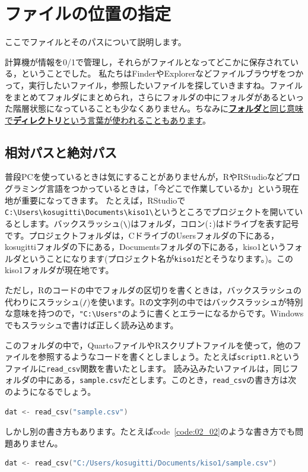 \documentclass{ltjsbook}
\begin{document}
\section{ファイルの位置の指定}
\label{setLocation}
ここでファイルとそのパスについて説明します。

計算機が情報を0/1で管理し，それらがファイルとなってどこかに保存されている，ということでした。
私たちはFinderやExplorerなどファイルブラウザをつかって，実行したいファイル，参照したいファイルを探していきますね。ファイルをまとめてフォルダにまとめられ，さらにフォルダの中にフォルダがあるといった階層状態になっていることも少なくありません。ちなみに\underline{\textbf{フォルダ}と同じ意味で\textbf{ディレクトリ}という言葉が使われることもあります}。

\subsection{相対パスと絶対パス}
普段PCを使っているときは気にすることがありませんが，RやRStudioなどプログラミング言語をつかっているときは，「今どこで作業しているか」という現在地が重要になってきます。
たとえば，RStudioで\verb|C:\Users\kosugitti\Documents\kiso1\|というところでプロジェクトを開いているとします。バックスラッシュ(\verb|\|)はフォルダ，コロン(\verb|:|)はドライブを表す記号です。プロジェクトフォルダは，CドライブのUsersフォルダの下にある，kosugittiフォルダの下にある，Documentsフォルダの下にある，kiso1というフォルダということになります(プロジェクト名が\texttt{kiso1}だとそうなります。)。このkiso1フォルダが現在地です。

ただし，Rのコードの中でフォルダの区切りを書くときは，バックスラッシュの代わりにスラッシュ(\verb|/|)を使います。Rの文字列の中ではバックスラッシュが特別な意味を持つので，\verb|"C:\Users"|のように書くとエラーになるからです。Windowsでもスラッシュで書けば正しく読み込めます。

このフォルダの中で，QuartoファイルやRスクリプトファイルを使って，他のファイルを参照するようなコードを書くとしましょう。たとえば\verb|script1.R|というファイルに\verb|read_csv|関数を書いたとします。
読み込みたいファイルは，同じフォルダの中にある，\verb|sample.csv|だとします。このとき，\verb|read_csv|の書き方は次のようになるでしょう。

\begin{lstlisting}[language=c++,label={code:02_01},caption={相対パスで読み込む}]
dat <- read_csv("sample.csv")
\end{lstlisting}

しかし別の書き方もあります。たとえばcode~\ref{code:02_02}のような書き方でも問題ありません。
\begin{lstlisting}[language=c++,label={code:02_02},caption={絶対パスで読み込む}]
dat <- read_csv("C:/Users/kosugitti/Documents/kiso1/sample.csv")
\end{lstlisting}
\end{document}
